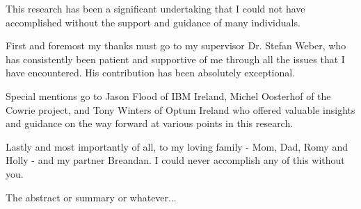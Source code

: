 \documentclass[a4paper, 12pt, oneside]{report}
\begin{document}

\thesistitlepage                            %

\thesisdeclarationpage				  		%

\thesispermissionpage				  		%


\begin{thesisacknowledgments}               %
This research has been a significant undertaking that I could not have accomplished without the support and guidance of many individuals. 

First and foremost my thanks must go to my supervisor Dr. Stefan Weber, who has consistently been patient and supportive of me through all the issues that I have encountered. His contribution has been absolutely exceptional.

Special mentions go to Jason Flood of IBM Ireland, Michel Oosterhof of the Cowrie project, and Tony Winters of Optum Ireland who offered valuable insights and guidance on the way forward at various points in this research.

Lastly and most importantly of all, to my loving family - Mom, Dad, Romy and Holly - and my partner Breandan. I could never accomplish any of this without you.

\end{thesisacknowledgments}                 %

\begin{thesisabstract}

The abstract or summary or whatever...

\end{thesisabstract}

\tableofcontents                            %
\listoftables                               %
\listoffigures                              %

                                
                                






\begin{appendix}

\end{appendix}
\end{document}
